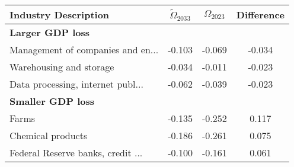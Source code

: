 \begin{tabular}{lccc}
\toprule
Industry Description & $\tilde{\Omega}_{2033}$ & $\Omega_{2023}$ & Difference \\
\midrule
\midrule
\multicolumn{2}{l}{\textbf{Larger GDP loss}} \\
\midrule
Management of companies and en... & -0.103 & -0.069 & -0.034 \\
Warehousing and storage & -0.034 & -0.011 & -0.023 \\
Data processing, internet publ... & -0.062 & -0.039 & -0.023 \\
\midrule
\multicolumn{2}{l}{\textbf{Smaller GDP loss}} \\
\midrule
Farms & -0.135 & -0.252 & 0.117 \\
Chemical products & -0.186 & -0.261 & 0.075 \\
Federal Reserve banks, credit ... & -0.100 & -0.161 & 0.061 \\
\bottomrule
\end{tabular}